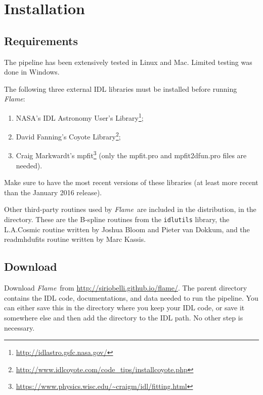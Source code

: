 \documentclass[a4paper]{article}
\newcommand{\flame}{\emph{Flame}}
\begin{document}
\begin{sloppypar}
\section{Installation}
\label{sec:installation}


\subsection{Requirements}

The pipeline has been extensively tested in Linux and Mac. Limited testing was done in Windows.

The following three external IDL libraries must be installed before running \flame:
\begin{enumerate}
\item NASA's IDL Astronomy User's Library\footnote{\url{http://idlastro.gsfc.nasa.gov/}};
\item David Fanning's Coyote Library\footnote{\url{http://www.idlcoyote.com/code_tips/installcoyote.php}};
\item Craig Markwardt's mpfit\footnote{\url{https://www.physics.wisc.edu/~craigm/idl/fitting.html}} (only the mpfit.pro and mpfit2dfun.pro files are needed).
\end{enumerate}
Make sure to have the most recent versions of these libraries (at least more recent than the January 2016 release).

Other third-party routines used by \flame\ are included in the distribution, in the  directory. These are the B-spline routines from the \texttt{idlutils} library, the L.A.Cosmic routine written by Joshua Bloom and Pieter van Dokkum, and the readmhdufits routine written by Marc Kassis.


\subsection{Download}

Download \flame\ from \url{http://siriobelli.github.io/flame/}. The parent directory  contains the IDL code, documentations, and data needed to run the pipeline. You can either save this in the directory where you keep your IDL code, or save it somewhere else and then add the  directory to the IDL path. No other step is necessary.









\end{sloppypar}
\end{document}
